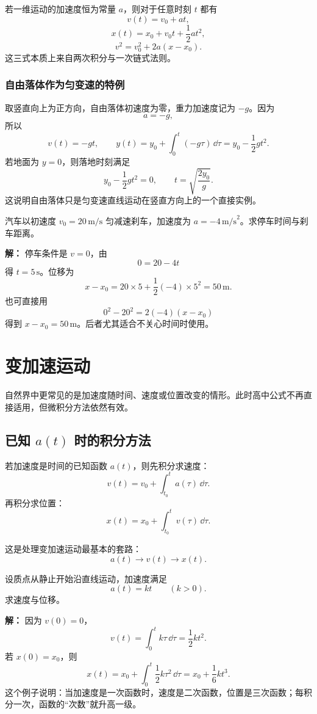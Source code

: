 \begin{theorem}[匀变速直线运动公式]
若一维运动的加速度恒为常量 $a$，则对于任意时刻 $t$ 都有
\[
 v(t)=v_0+at,
\]
\[
 x(t)=x_0+v_0 t+\frac12 at^2,
\]
\[
 v^2=v_0^2+2a(x-x_0).
\]
这三式本质上来自两次积分与一次链式法则。
\end{theorem}

\subsubsection*{自由落体作为匀变速的特例}
取竖直向上为正方向，自由落体初速度为零，重力加速度记为 $-g$。因为
\[
 a=-g,
\]
所以
\[
 v(t)=-gt,
\qquad
 y(t)=y_0+\int_0^t (-g\tau)\,\dd \tau=y_0-\frac12 gt^2.
\]
若地面为 $y=0$，则落地时刻满足
\[
 y_0-\frac12 gt^2=0,
\qquad
 t=\sqrt{\frac{2y_0}{g}}.
\]
这说明自由落体只是匀变速直线运动在竖直方向上的一个直接实例。

\begin{example}[汽车刹车]
汽车以初速度 $v_0=20\,\text{m/s}$ 匀减速刹车，加速度为 $a=-4\,\text{m/s}^2$。求停车时间与刹车距离。

\textbf{解：}
停车条件是 $v=0$，由
\[
 0=20-4t
\]
得 $t=5\,\text{s}$。位移为
\[
 x-x_0=20\times 5+\frac12(-4)\times 5^2=50\,\text{m}.
\]
也可直接用
\[
 0^2-20^2=2(-4)(x-x_0)
\]
得到 $x-x_0=50\,\text{m}$。后者尤其适合不关心时间时使用。
\end{example}

\section{变加速运动}

自然界中更常见的是加速度随时间、速度或位置改变的情形。此时高中公式不再直接适用，但微积分方法依然有效。

\subsection{已知 $a(t)$ 时的积分方法}

若加速度是时间的已知函数 $a(t)$，则先积分求速度：
\[
 v(t)=v_0+\int_{t_0}^{t} a(\tau)\,\dd \tau.
\]
再积分求位置：
\[
 x(t)=x_0+\int_{t_0}^{t} v(\tau)\,\dd \tau.
\]

这是处理变加速运动最基本的套路：
\[
 a(t) \longrightarrow v(t) \longrightarrow x(t).
\]

\begin{example}[线性增大的加速度]
设质点从静止开始沿直线运动，加速度满足
\[
 a(t)=kt \qquad (k>0).
\]
求速度与位移。

\textbf{解：}
因为 $v(0)=0$，
\[
 v(t)=\int_0^t k\tau\,\dd \tau=\frac12 kt^2.
\]
若 $x(0)=x_0$，则
\[
 x(t)=x_0+\int_0^t \frac12 k\tau^2\,\dd \tau=x_0+\frac16 kt^3.
\]
这个例子说明：当加速度是一次函数时，速度是二次函数，位置是三次函数；每积分一次，函数的``次数''就升高一级。
\end{example}

